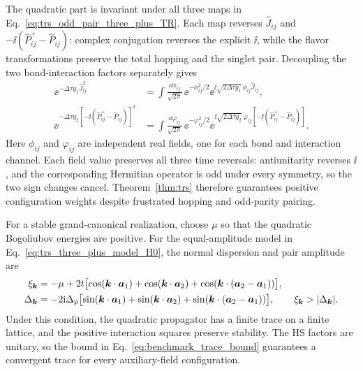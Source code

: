 The quadratic part is invariant under all three maps in Eq.~\eqref{eq:trs_odd_pair_three_plus_TR}. Each map reverses $\hat J_{ij}$ and $-\ii(\hat P_{ij}^+-\hat P_{ij})$: complex conjugation reverses the explicit $\ii$, while the flavor transformations preserve the total hopping and the singlet pair. Decoupling the two bond-interaction factors separately gives
\begin{equation}
\begin{aligned}
    \ee^{-\Delta\tau g_1\hat J_{ij}^2}
    &=\int\frac{\dd\phi_{ij}}{\sqrt{2\pi}}\,
      \ee^{-\phi_{ij}^2/2}
      \ee^{\ii\sqrt{2\Delta\tau g_1}\,\phi_{ij}\hat J_{ij}},\\
    \ee^{-\Delta\tau g_2[-\ii(\hat P_{ij}^+-\hat P_{ij})]^2}
    &=\int\frac{\dd\varphi_{ij}}{\sqrt{2\pi}}\,
      \ee^{-\varphi_{ij}^2/2}
      \ee^{\ii\sqrt{2\Delta\tau g_2}\,\varphi_{ij}
        [-\ii(\hat P_{ij}^+-\hat P_{ij})]}.
    \label{eq:trs_three_plus_HS}
\end{aligned}
\end{equation}
Here $\phi_{ij}$ and $\varphi_{ij}$ are independent real fields, one for each bond and interaction channel. Each field value preserves all three time reversals: antiunitarity reverses $\ii$, and the corresponding Hermitian operator is odd under every symmetry, so the two sign changes cancel. Theorem~\ref{thm:trs} therefore guarantees positive configuration weights despite frustrated hopping and odd-parity pairing.

For a stable grand-canonical realization, choose $\mu$ so that the quadratic Bogoliubov energies are positive. For the equal-amplitude model in Eq.~\eqref{eq:trs_three_plus_model_H0}, the normal dispersion and pair amplitude are
\begin{align}
    \xi_{\bm{k}}&=-\mu+2t\bigl[\cos(\bm{k}\cdot\bm{a}_1)
       +\cos(\bm{k}\cdot\bm{a}_2)
       +\cos(\bm{k}\cdot(\bm{a}_2-\bm{a}_1))\bigr],
    \label{eq:trs_three_plus_dispersion}\\
    \Delta_{\bm{k}}&=-2\mathrm{i}\Delta_{\rm p}\bigl[\sin(\bm{k}\cdot\bm{a}_1)
       +\sin(\bm{k}\cdot\bm{a}_2)
       +\sin(\bm{k}\cdot(\bm{a}_2-\bm{a}_1))\bigr],
    \qquad \xi_{\bm{k}}>|\Delta_{\bm{k}}|.
    \label{eq:trs_three_plus_pair_form_factor}
\end{align}
Under this condition, the quadratic propagator has a finite trace on a finite lattice, and the positive interaction squares preserve stability. The HS factors are unitary, so the bound in Eq.~\eqref{eq:benchmark_trace_bound} guarantees a convergent trace for every auxiliary-field configuration.

